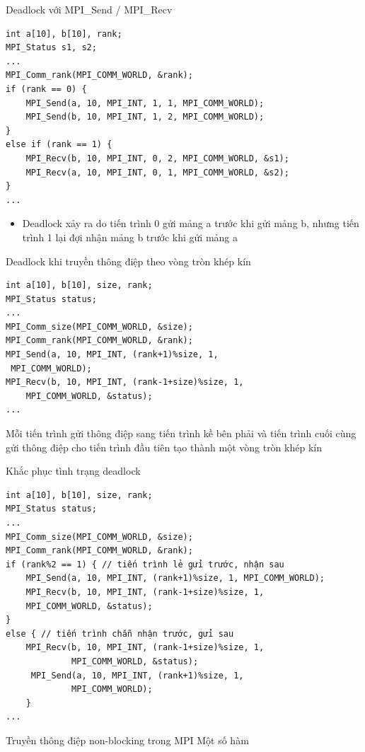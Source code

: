 \documentclass[10pt]{beamer}
\theoremstyle{remark}
\numberwithin{algocf}{section}
\numberwithin{equation}{section}
\numberwithin{dl}{section}
\numberwithin{figure}{section}
\begin{document}
\begin{frame}[fragile]{Deadlock với MPI\_Send / MPI\_Recv}
    \begin{verbatim}
int a[10], b[10], rank;
MPI_Status s1, s2;
...
MPI_Comm_rank(MPI_COMM_WORLD, &rank);
if (rank == 0) {
    MPI_Send(a, 10, MPI_INT, 1, 1, MPI_COMM_WORLD);
    MPI_Send(b, 10, MPI_INT, 1, 2, MPI_COMM_WORLD);
}
else if (rank == 1) {
    MPI_Recv(b, 10, MPI_INT, 0, 2, MPI_COMM_WORLD, &s1);
    MPI_Recv(a, 10, MPI_INT, 0, 1, MPI_COMM_WORLD, &s2);
}
...
    \end{verbatim}

    \begin{itemize}
        \item Deadlock xảy ra do tiến trình 0 gửi mảng a trước khi gửi mảng b, nhưng tiến trình 1 lại đợi nhận mảng b trước khi gửi mảng a
    \end{itemize}
\end{frame}

\begin{frame}[fragile]{Deadlock khi truyền thông điệp theo vòng tròn khép kín}
    \begin{verbatim}
int a[10], b[10], size, rank;
MPI_Status status;
...
MPI_Comm_size(MPI_COMM_WORLD, &size);
MPI_Comm_rank(MPI_COMM_WORLD, &rank);
MPI_Send(a, 10, MPI_INT, (rank+1)%size, 1,
 MPI_COMM_WORLD);
MPI_Recv(b, 10, MPI_INT, (rank-1+size)%size, 1,
    MPI_COMM_WORLD, &status);
... 
    \end{verbatim}
    Mỗi tiến trình gửi thông điệp sang tiến trình kề bên phải và tiến trình cuối cùng gửi thông điệp cho tiến trình đầu tiên tạo thành một vòng tròn khép kín
\end{frame}

\begin{frame}[fragile]{Khắc phục tình trạng deadlock}
    \begin{verbatim}
int a[10], b[10], size, rank;
MPI_Status status;
...
MPI_Comm_size(MPI_COMM_WORLD, &size);
MPI_Comm_rank(MPI_COMM_WORLD, &rank);
if (rank%2 == 1) { // tiến trình lẻ gửi trước, nhận sau
    MPI_Send(a, 10, MPI_INT, (rank+1)%size, 1, MPI_COMM_WORLD);
    MPI_Recv(b, 10, MPI_INT, (rank-1+size)%size, 1,
    MPI_COMM_WORLD, &status);
}
else { // tiến trình chẵn nhận trước, gửi sau
    MPI_Recv(b, 10, MPI_INT, (rank-1+size)%size, 1,
             MPI_COMM_WORLD, &status);
     MPI_Send(a, 10, MPI_INT, (rank+1)%size, 1,
             MPI_COMM_WORLD);
    }
...     
    \end{verbatim}
\end{frame}

\begin{frame}{Truyền thông điệp non-blocking trong MPI}
    Một số hàm
\end{frame}
\end{document}
